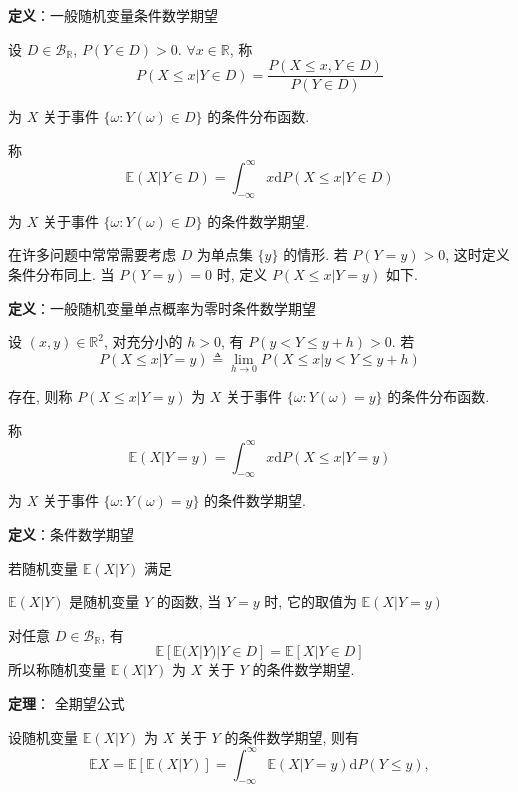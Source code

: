 \documentclass[openany]{ctexbook}
\theoremstyle{kaiti}
\theoremstyle{normal}
\begin{document}
\textbf{定义}：一般随机变量条件数学期望

设 $D\in\mathcal{B}_{\mathbb{R}}$, $P(Y\in D)>0$. $\forall x\in\mathbb{R}$, 称 
\begin{equation}
  P(X\leqslant x|Y\in D)=\frac{P(X\leqslant x,Y\in D)}{P(Y\in D)}
\end{equation} 

为 $X$ 关于事件 $\{\omega:Y(\omega)\in D\}$ 的条件分布函数. 

称
\begin{equation}
  \mathbb{E}(X|Y\in D)=\int_{-\infty}^\infty x\mathrm{d}P(X\leqslant x|Y\in D)
\end{equation}

为 $X$ 关于事件 $\{\omega:Y(\omega)\in D\}$ 的条件数学期望.

在许多问题中常常需要考虑 $D$ 为单点集 $\{y\}$ 的情形. 若 $P(Y=y)>0$, 这时定义条件分布同上. 当 $P(Y=y)=0$ 时, 定义 $P(X\leqslant x|Y=y)$ 如下.

\textbf{定义}：一般随机变量单点概率为零时条件数学期望

设 $(x,y)\in\mathbb{R}^2$, 对充分小的 $h>0$, 有 $P(y<Y\leqslant y+h)>0$. 若
\begin{equation}
  P(X\leqslant x|Y=y)\triangleq\lim_{h\to0}P(X\leqslant x|y<Y\leqslant y+h)
\end{equation}

存在, 则称 $P(X\leqslant x|Y=y)$ 为 $X$ 关于事件 $\{\omega:Y(\omega)=y\}$ 的条件分布函数. 

称
\begin{equation}
  \mathbb{E}(X|Y=y)=\int_{-\infty}^\infty x\mathrm{d}P(X\leqslant x|Y=y)
\end{equation}

为 $X$ 关于事件 $\{\omega:Y(\omega)=y\}$ 的条件数学期望.

\textbf{定义}：条件数学期望

若随机变量 $\mathbb{E}(X|Y)$ 满足

$\mathbb{E}(X|Y)$ 是随机变量 $Y$ 的函数, 当 $Y=y$ 时, 它的取值为 $\mathbb{E}(X|Y=y)$

对任意 $D\in\mathcal{B}_{\mathbb{R}}$, 有
\begin{equation}
  \mathbb{E}[\mathbb{E}(X|Y)|Y\in D]=\mathbb{E}[X|Y\in D]
\end{equation}
所以称随机变量 $\mathbb{E}(X|Y)$ 为 $X$ 关于 $Y$ 的条件数学期望.

\textbf{定理}： 全期望公式

设随机变量 $\mathbb{E}(X|Y)$ 为 $X$ 关于 $Y$ 的条件数学期望, 则有
\begin{equation}
  \mathbb{E}X=\mathbb{E}[\mathbb{E}(X|Y)]=\int_{-\infty}^\infty \mathbb{E}(X|Y=y)\mathrm{d}P(Y\leqslant y),
\end{equation}
\end{document}
